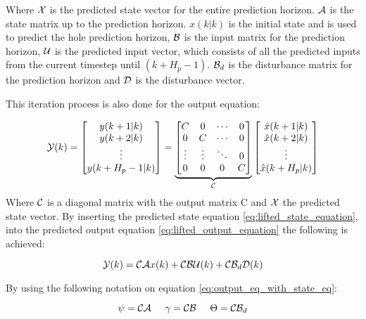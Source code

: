Where $\CMcal{X}$ is the predicted state vector for the entire prediction horizon. $\CMcal{A}$ is the state matrix up to the prediction horizon. $x(k|k)$ is the initial state and is used to predict the hole prediction horizon, $\CMcal{B}$ is the input matrix for the prediction horizon, $\CMcal{U}$ is the predicted input vector, which consists of all the predicted inputs from the current timestep until $(k+H_p-1)$. $\CMcal{B}_d$ is the disturbance matrix for the prediction horizon and $\CMcal{D}$ is the disturbance vector. 

This iteration process is also done for the output equation:

\begin{equation}\label{eq:lifted_output_equation}
	\CMcal{Y}(k)= 
	\begin{bmatrix}
	y(k+1|k)\\
	y(k+2|k)\\
	\vdots\\
	y(k+H_p-1|k)
	\end{bmatrix}
	= 
	\underbrace{\begin{bmatrix}
	C 		& 0 	&\cdots	& 0\\
	0 		& C 	&\cdots & 0 \\
	\vdots	& \vdots&\ddots & 0\\
	0 		& 0		&0 		& C
	\end{bmatrix}}_{\CMcal{C}}
	  \begin{bmatrix}
	  \hat{x}(k+1|k) 	\\
	  \hat{x}(k+2|k) 	\\
	  \vdots 			\\
	  \hat{x}(k+H_p|k) 	\\
	   \end{bmatrix}
\end{equation}
Where $\CMcal{C}$ is a diagonal matrix with the output matrix C and $\CMcal{X}$ the predicted state vector. By inserting the predicted state equation \ref{eq:lifted_state_equation}, into the predicted output equation \ref{eq:lifted_output_equation} the following is achieved:

\begin{equation}\label{eq:output_eq_with_state_eq}
	\CMcal{Y}(k) =  \CMcal{C}\CMcal{A}x(k) +  \CMcal{C}\CMcal{B}\CMcal{U}(k) +\CMcal{C}\CMcal{B}_d\CMcal{D}(k)
\end{equation}   

By using the following notation on equation \ref{eq:output_eq_with_state_eq}:


\begin{equation}
 \psi = \CMcal{C}\CMcal{A}  \hspace{5mm} \gamma = \CMcal{C}\CMcal{B} \hspace{5mm}  \Theta = \CMcal{C}\CMcal{B}_{d}
\end{equation}

